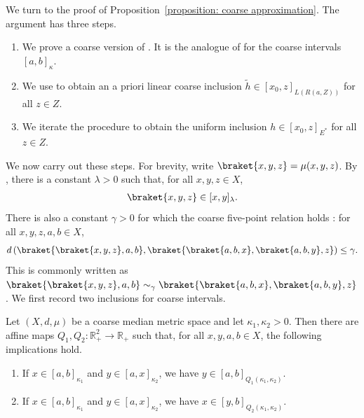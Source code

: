 \documentclass[12pt,reqno]{amsart}
\newcommand{\R}{\mathbb{R}}
\numberwithin{equation}{section}
\begin{document}
We turn to the proof of Proposition~\ref{proposition: coarse approximation}. The argument has three steps.
\begin{enumerate}
    \item We prove a coarse version of \cite[Lemma 5.4]{SpakulaWright2017propertyA}. It is the analogue of \cite[Lemma 4.8]{NibloWrightZang2019fourpoint} for the coarse intervals $[a,b]_\kappa$.
    \item We use \cite[Corollary 6.3]{SpakulaWright2017propertyA} to obtain an a priori linear coarse inclusion $\widetilde{h}\in [x_0,z]_{L(R(a,Z))}$ for all $z\in Z$.
    \item We iterate the procedure to obtain the uniform inclusion $h\in [x_0,z]_{E^*}$ for all $z\in Z$.
\end{enumerate}
We now carry out these steps. For brevity, write $\braket{x,y,z}=\mu(x,y,z)$. By \cite[Lemma 9.2]{Bowditch2014embedding}, there is a constant $\lambda>0$ such that, for all $x,y,z\in X$, 
\begin{align*}
    \braket{x,y,z}\in [x,y]_\lambda.
\end{align*}
There is also a constant $\gamma>0$ for which the coarse five-point relation holds \cite[Equation (2)]{NibloWrightZang2021}: for all $x,y,z,a,b\in X$,
\begin{align*}
    d\left(\braket{\braket{x,y,z},a,b}, \braket{\braket{a,b,x},\braket{a,b,y},z}\right)\le \gamma.
\end{align*}
This is commonly written as $\braket{\braket{x,y,z},a,b} \sim_\gamma \braket{\braket{a,b,x},\braket{a,b,y},z}$. 
We first record two inclusions for coarse intervals.
\begin{lemma}\label{lemma: inclusions coarse}
    Let $(X,d,\mu)$ be a coarse median metric space and let $\kappa_1,\kappa_2>0$. Then there are affine maps $Q_1,Q_2:\R_+^2\to\R_+$ such that, for all $x, y, a, b\in X$, the following implications hold.
    \begin{enumerate}
        \item If $x\in [a,b]_{\kappa_1}$ and $y\in [a,x]_{\kappa_2}$, we have $y\in [a,b]_{Q_1(\kappa_1,\kappa_2)}$.
        \item If $x\in [a,b]_{\kappa_1}$ and $y\in [a,x]_{\kappa_2}$, we have $x\in [y,b]_{Q_2(\kappa_1,\kappa_2)}$.
    \end{enumerate}
\end{lemma}
\end{document}
